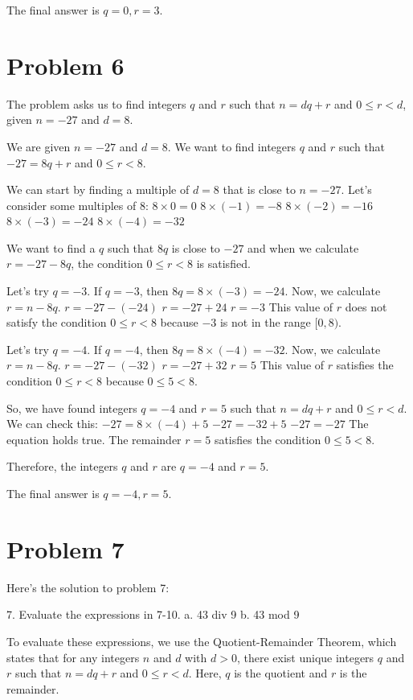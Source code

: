 \documentclass{article}
\begin{document}
The final answer is $\boxed{q=0, r=3}$.

\newpage

\section*{Problem 6}
The problem asks us to find integers $q$ and $r$ such that $n = dq + r$ and $0 \leq r < d$, given $n = -27$ and $d = 8$.

We are given $n = -27$ and $d = 8$.
We want to find integers $q$ and $r$ such that $-27 = 8q + r$ and $0 \leq r < 8$.

We can start by finding a multiple of $d=8$ that is close to $n=-27$.
Let's consider some multiples of 8:
$8 \times 0 = 0$
$8 \times (-1) = -8$
$8 \times (-2) = -16$
$8 \times (-3) = -24$
$8 \times (-4) = -32$

We want to find a $q$ such that $8q$ is close to $-27$ and when we calculate $r = -27 - 8q$, the condition $0 \leq r < 8$ is satisfied.

Let's try $q = -3$.
If $q = -3$, then $8q = 8 \times (-3) = -24$.
Now, we calculate $r = n - 8q$.
$r = -27 - (-24)$
$r = -27 + 24$
$r = -3$
This value of $r$ does not satisfy the condition $0 \leq r < 8$ because $-3$ is not in the range $[0, 8)$.

Let's try $q = -4$.
If $q = -4$, then $8q = 8 \times (-4) = -32$.
Now, we calculate $r = n - 8q$.
$r = -27 - (-32)$
$r = -27 + 32$
$r = 5$
This value of $r$ satisfies the condition $0 \leq r < 8$ because $0 \leq 5 < 8$.

So, we have found integers $q = -4$ and $r = 5$ such that $n = dq + r$ and $0 \leq r < d$.
We can check this:
$-27 = 8 \times (-4) + 5$
$-27 = -32 + 5$
$-27 = -27$
The equation holds true.
The remainder $r=5$ satisfies the condition $0 \leq 5 < 8$.

Therefore, the integers $q$ and $r$ are $q = -4$ and $r = 5$.

The final answer is $\boxed{q = -4, r = 5}$.

\newpage

\section*{Problem 7}
Here's the solution to problem 7:

7. Evaluate the expressions in 7-10.
a. 43 div 9
b. 43 mod 9

To evaluate these expressions, we use the Quotient-Remainder Theorem, which states that for any integers $n$ and $d$ with $d > 0$, there exist unique integers $q$ and $r$ such that $n = dq + r$ and $0 \le r < d$. Here, $q$ is the quotient and $r$ is the remainder.
\end{document}
